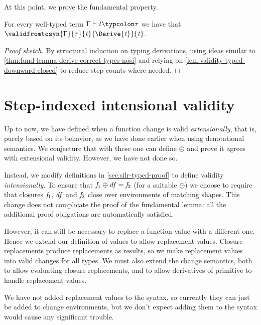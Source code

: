 At this point, we prove the fundamental property.
\begin{theorem}
  \label{thm:fund-lemma-derive-correct-types-si}
  For every well-typed term \ensuremath{\Gamma\vdash\Varid{t}\typcolon\tau} we have that
  \ensuremath{\validfromtosyn{\Gamma}{\tau}{\Varid{t}}{\Derive{\Varid{t}}}{\Varid{t}}}.
\end{theorem}
\begin{proof}[Proof sketch]
  By structural induction on typing derivations, using ideas
similar to \cref{thm:fund-lemma-derive-correct-types-nosi} and
relying on \cref{lem:validity-typed-downward-closed} to reduce
step counts where needed.
\end{proof}

\section{Step-indexed intensional validity}
\label{sec:intensional-step-indexed-validity}

Up to now, we have defined when a function change is valid
\emph{extensionally}, that is, purely based on its behavior, as
we have done earlier when using denotational semantics.
We conjecture that with these one can define \ensuremath{\oplus } and prove
it agrees with extensional validity. However, we have not done
so.

Instead, we modify definitions in \cref{sec:silr-typed-proof} to
define validity \emph{intensionally}.
To ensure that \ensuremath{\Varid{f}_{1}\oplus \Varid{df}\mathrel{=}\Varid{f}_{2}} (for a suitable \ensuremath{\oplus }) we
choose to require that closures \ensuremath{\Varid{f}_{1}}, \ensuremath{\Varid{df}} and \ensuremath{\Varid{f}_{2}} close over
environments of matching shapes. This change does not complicate
the proof of the fundamental lemma: all the additional proof obligations
are automatically satisfied.

However, it can still be necessary to replace a function value
with a different one. Hence we extend our definition of values to
allow replacement values. Closure replacements produce
replacements as results, so we make replacement values
into valid changes for all types. We must also extend the change
semantics, both to allow evaluating closure replacements, and to
allow derivatives of primitive to handle replacement values.

We have not added replacement values to the syntax, so currently
they can just be added to change environments, but we don't
expect adding them to the syntax would cause any significant trouble.

